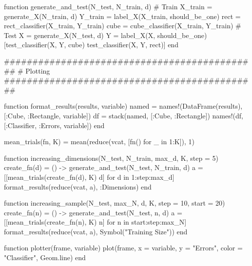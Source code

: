 \documentclass[a4paper,12pt]{article}
\begin{document}
\begin{juliacode}
function generate_and_test(N_test, N_train, d)
    # Train
    X_train = generate_X(N_train, d)
    Y_train = label_X(X_train, should_be_one)
    rect = rect_classifier(X_train, Y_train)
    cube = cube_classifier(X_train, Y_train)
    # Test
    X = generate_X(N_test, d)
    Y = label_X(X, should_be_one)
    [test_classifier(X, Y, cube) test_classifier(X, Y, rect)]
end

#############################################
# Plotting
#############################################

function format_results(results, variable)
    named = names!(DataFrame(results), [:Cube, :Rectangle, variable])
    df = stack(named, [:Cube, :Rectangle])
    names!(df, [:Classifier, :Errors, variable])
end

mean_trials(fn, K) = mean(reduce(vcat, [fn() for _ in 1:K]), 1)

function increasing_dimensions(N_test, N_train, max_d, K, step = 5)
    create_fn(d) = () -> generate_and_test(N_test, N_train, d)
    a = [[mean_trials(create_fn(d), K) d] for d in 1:step:max_d]
    format_results(reduce(vcat, a), :Dimensions)
end

function increasing_sample(N_test, max_N, d,  K, step = 10, start = 20)
    create_fn(n) = () -> generate_and_test(N_test, n, d)
    a = [[mean_trials(create_fn(n), K) n] for n in start:step:max_N]
    format_results(reduce(vcat, a), Symbol("Training Size"))
end

function plotter(frame, variable)
    plot(frame, x = variable, y = "Errors", color = "Classifier", Geom.line)
end
\end{juliacode}
\end{document}
